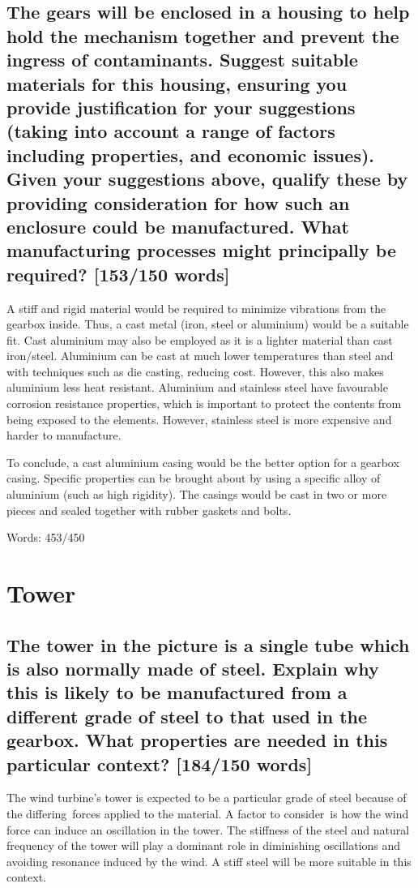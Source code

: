 \documentclass[12pt]{article}
\numberwithin{equation}{section}
\begin{document}
\begin{flushleft}
\subsection[Gearbox casing material.]{The gears will be enclosed in a housing to help hold the mechanism together and prevent the ingress of contaminants. Suggest suitable materials for this housing, ensuring you provide justification for your suggestions (taking into account a range of factors including properties, and economic issues). Given your suggestions above, qualify these by providing consideration for how such an enclosure could be manufactured. What manufacturing processes might principally be required? [153/150 words]}
A stiff and rigid material would be required to minimize vibrations from the gearbox inside. Thus, a cast metal (iron, steel or aluminium) would be a suitable fit. Cast aluminium may also be employed as it is a lighter material than cast iron/steel. Aluminium can be cast at much lower temperatures than steel and with techniques such as die casting, reducing cost. However, this also makes aluminium less heat resistant. Aluminium and stainless steel have favourable corrosion resistance properties, which is important to protect the contents from being exposed to the elements. However, stainless steel is more expensive and harder to manufacture.

To conclude, a cast aluminium casing would be the better option for a gearbox casing. Specific properties can be brought about by using a specific alloy of aluminium (such as high rigidity). The casings would be cast in two or more pieces and sealed together with rubber gaskets and bolts.

Words: 453/450

\section{Tower}
\subsection[Tower steel.]{The tower in the picture is a single tube which is also normally made of steel. Explain why this is likely to be manufactured from a different grade of steel to that used in the gearbox. What properties are needed in this particular context? [184/150 words]}
The wind turbine’s tower is expected to be a particular grade of steel because of the differing forces applied to the material. A factor to consider is how the wind force can induce an oscillation in the tower. The stiffness of the steel and natural frequency of the tower will play a dominant role in diminishing oscillations and avoiding resonance induced by the wind. A stiff steel will be more suitable in this context. 


\end{flushleft}
\end{document}
